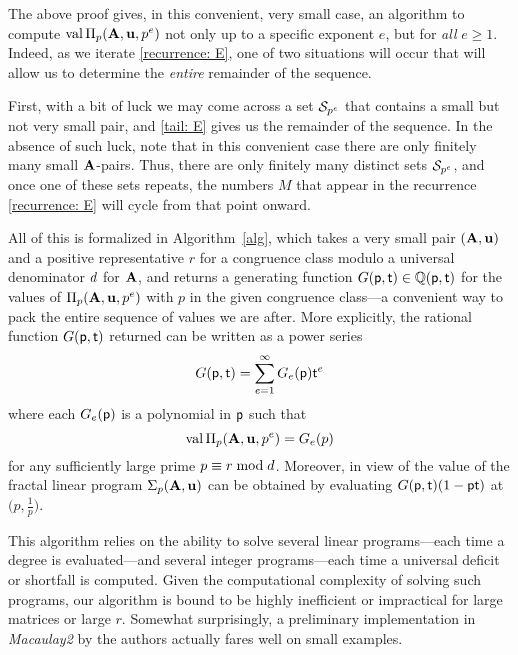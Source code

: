 \documentclass{amsart}
\begin{document}
\begin{remark}[An algorithm]
   \label{convenient algorithm: R}
   The above proof gives, in this convenient, very small case, an algorithm to compute $\val\IP_p(\matA,\vv{u},p^e)$ not only up to a specific exponent $e$, but for \emph{all} $e \ge 1$.
   Indeed, as we iterate \eqref{recurrence: E}, one of two situations will occur that will allow us to determine the \emph{entire} remainder of the sequence.

   First, with a bit of luck we may come across a set $\S_{p^e}$ that contains a small but not very small pair, and \eqref{tail: E} gives us the remainder of the sequence.
   In the absence of such luck, note that in this convenient case there are only finitely many small $\matA$-pairs.
   Thus, there are only finitely many distinct sets $\S_{p^e}$, and once one of these sets repeats, the numbers $M$ that appear in the recurrence \eqref{recurrence: E} will cycle from that point onward.

   All of this is formalized in Algorithm~\ref{alg}, which takes a very small pair $(\matA,\vv{u})$ and a positive representative $r$ for a congruence class modulo a universal denominator $\denom$ for $\matA$, and returns a generating function $G(\pp,\tt) \in \QQ(\pp,\tt)$ for the values of $\IP_p(\matA,\vv{u},p^e)$ with $p$ in the given congruence class---a convenient way to pack the entire sequence of values we are after.
   More explicitly, the rational function $G(\pp,\tt)$ returned can be written as a power series
   \[G(\pp,\tt) = \sum_{e=1}^\infty G_e(\pp)\tt^e\]
   where each $G_e(\pp)$ is a polynomial in $\pp$ such that
   \[ \val \IP_p(\matA,\vv{u},p^e) = G_e(p)\]
   for any sufficiently large prime $p\equiv r\bmod \denom$.
   Moreover, in view of  the value of the fractal linear program $\fip_p(\matA,\vv{u})$ can be obtained by evaluating $G(\pp,\tt)(1-\pp\tt)$ at $\big(p,\frac1p\big)$.

  This algorithm relies on the ability to solve several linear programs---each time a degree is evaluated---and several integer programs---each time a universal deficit or shortfall is computed.
   Given the computational complexity of solving such programs, our algorithm is bound to be highly inefficient or impractical for large matrices or large $r$.
   Somewhat surprisingly, a preliminary implementation in \emph{Macaulay2} \cite{M2} by the authors actually fares well on small examples.
\end{remark}
\end{document}
